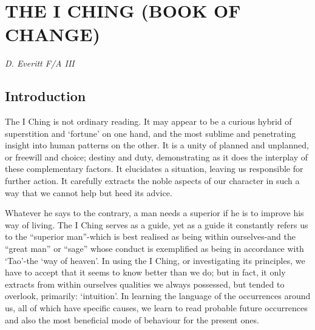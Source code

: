 \documentclass[11pt]{book}
\author{Fania Everitt}
\date{15/09/2021}
\begin{document}



\mainmatter
\hypertarget{the-i-ching-book-of-change}{%
\chapter{THE I CHING (BOOK OF CHANGE)}\label{the-i-ching-book-of-change}}

\emph{D. Everitt F/A III}

\hypertarget{introduction}{%
\section{Introduction}\label{introduction}}

The I Ching is not ordinary reading. It may appear to be a curious hybrid of superstition and `fortune' on one hand, and the most sublime and penetrating insight into human patterns on the other. It is a unity of planned and unplanned, or freewill and choice; destiny and duty, demonstrating as it does the interplay of these complementary factors. It elucidates a situation, leaving us responsible for further action. It carefully extracts the noble aspects of our character in such a way that we cannot help but heed its advice.

Whatever he says to the contrary, a man needs a superior if he is to improve his way of living. The I Ching serves as a guide, yet as a guide it constantly refers us to the ``superior man''-which is best realised as being within ourselves-and the ``great man'' or ``sage'' whose conduct is exemplified as being in accordance with `Tao'-the `way of heaven'. In using the I Ching, or investigating its principles, we have to accept that it seems to know better than we do; but in fact, it only extracts from within ourselves qualities we always possessed, but tended to overlook, primarily: `intuition'. In learning the language of the occurrences around us, all of which have specific causes, we learn to read probable future occurrences and also the most beneficial mode of behaviour for the present ones.
\end{document}
